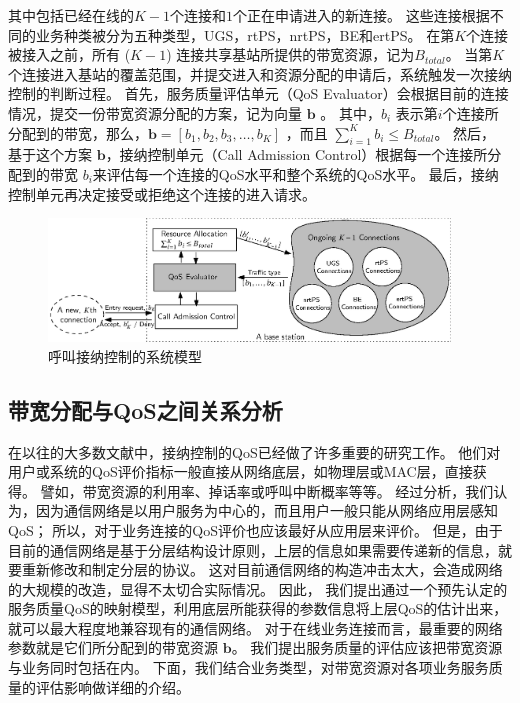 其中包括已经在线的$K-1$个连接和$1$个正在申请进入的新连接。
这些连接根据不同的业务种类被分为五种类型，UGS，rtPS，nrtPS，BE和ertPS。
在第$K$个连接被接入之前，所有 ($K-1$) 连接共享基站所提供的带宽资源，记为$B_{total}$。
当第$K$个连接进入基站的覆盖范围，并提交进入和资源分配的申请后，系统触发一次接纳控制的判断过程。
首先，服务质量评估单元（QoS Evaluator）会根据目前的连接情况，提交一份带宽资源分配的方案，记为向量 $\mathbf{b}$ 。
其中，$b_i$ 表示第$i$个连接所分配到的带宽，那么，$\mathbf{b} = [ b_1, b_2, b_3, \dots, b_K]$ ，而且 $\sum_{i=1}^K b_i \le B_{total}$。
然后，
基于这个方案 $\mathbf{b}$，接纳控制单元（Call Admission Control）根据每一个连接所分配到的带宽 $b_i$来评估每一个连接的QoS水平和整个系统的QoS水平。
最后，接纳控制单元再决定接受或拒绝这个连接的进入请求。
\begin{figure}[t]
\centering
\includegraphics[width=0.95\textwidth]{cac_qos_model_system.eps}
\caption{ 呼叫接纳控制的系统模型} \label{fig_system_model_cac}
\end{figure}
\subsection{带宽分配与QoS之间关系分析}
在以往的大多数文献中，接纳控制的QoS已经做了许多重要的研究工作。
他们对用户或系统的QoS评价指标一般直接从网络底层，如物理层或MAC层，直接获得。
譬如，带宽资源的利用率、掉话率或呼叫中断概率等等。
经过分析，我们认为，因为通信网络是以用户服务为中心的，而且用户一般只能从网络应用层感知QoS；
所以，对于业务连接的QoS评价也应该最好从应用层来评价。
但是，由于目前的通信网络是基于分层结构设计原则，上层的信息如果需要传递新的信息，就要重新修改和制定分层的协议。
这对目前通信网络的构造冲击太大，会造成网络的大规模的改造，显得不太切合实际情况。
因此，
我们提出通过一个预先认定的服务质量QoS的映射模型，利用底层所能获得的参数信息将上层QoS的估计出来，
就可以最大程度地兼容现有的通信网络。
对于在线业务连接而言，最重要的网络参数就是它们所分配到的带宽资源 $\mathbf{b}$。
我们提出服务质量的评估应该把带宽资源与业务同时包括在内。
下面，我们结合业务类型，对带宽资源对各项业务服务质量的评估影响做详细的介绍。

